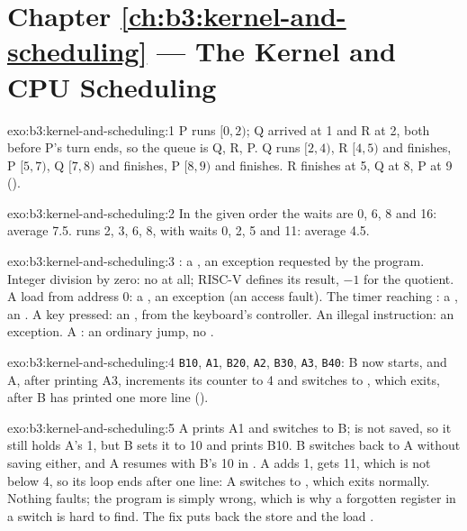 \section*{Chapter \ref{ch:b3:kernel-and-scheduling} --- The Kernel and CPU Scheduling}

\begin{solution}{exo:b3:kernel-and-scheduling:1}
P runs $[0, 2)$; Q arrived at 1 and R at 2, both before P's turn ends, so the queue is Q, R, P. Q runs $[2, 4)$, R $[4, 5)$ and finishes, P $[5, 7)$, Q $[7, 8)$ and finishes, P $[8, 9)$ and finishes. R finishes at 5, Q at 8, P at 9 ().
\end{solution}

\begin{solution}{exo:b3:kernel-and-scheduling:2}
In the given order the waits are 0, 6, 8 and 16: average 7.5.  runs 2, 3, 6, 8, with waits 0, 2, 5 and 11: average 4.5.
\end{solution}

\begin{solution}{exo:b3:kernel-and-scheduling:3}
: a , an exception requested by the program. Integer division by zero: no  at all; RISC-V defines its result, $-1$ for the quotient. %
A load from address 0: a , an exception (an access fault). The timer reaching : a , an . A key pressed: an , from the keyboard's controller. An illegal instruction: an exception. A : an ordinary jump, no .
\end{solution}

\begin{solution}{exo:b3:kernel-and-scheduling:4}
\texttt{B10}, \texttt{A1}, \texttt{B20}, \texttt{A2}, \texttt{B30}, \texttt{A3}, \texttt{B40}: B now starts, and A, after printing A3, increments its counter to 4 and switches to , which exits, after B has printed one more line ().
\end{solution}

\begin{solution}{exo:b3:kernel-and-scheduling:5}
A prints A1 and switches to B;  is not saved, so it still holds A's 1, but B sets it to 10 and prints B10. B switches back to A without saving  either, and A resumes with B's 10 in . A adds 1, gets 11, which is not below 4, so its loop ends after one line: A switches to , which exits normally. Nothing faults; the program is simply wrong, which is why a forgotten register in a switch is hard to find. The fix puts back the store  and the load .
\end{solution}

